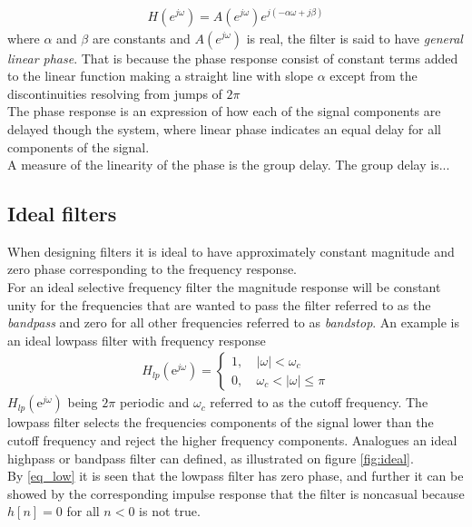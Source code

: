 \begin{align}
H(e^{j\omega})=A(e^{j\omega})e^{j(-\alpha\omega + j\beta)} 
\end{align}
where $\alpha$ and $\beta$ are constants and $A(e^{j\omega})$ is real, the filter is said to have \textit{general linear phase}. That is because the phase response consist of constant terms added to the linear function making a straight line with slope $\alpha$ except from the discontinuities resolving from jumps of $2\pi$ \\
The phase response is an expression of how each of the signal components are delayed though the system, where linear phase indicates an equal delay for all components of the signal.    \\
A measure of the linearity of the phase is the group delay. The group delay is...  

\subsection{Ideal filters} 
When designing filters it is ideal to have approximately constant magnitude and zero phase corresponding to the frequency response. \\ For an ideal selective frequency filter the magnitude response will be constant unity for the frequencies that are wanted to pass the filter referred to as the \textit{bandpass} and zero for all other frequencies referred to as \textit{bandstop}. An example is an ideal lowpass filter with frequency response 
\begin{align}\label{eq:low}
H_{lp}(\text{e}^{j\omega})=
\left\{ \begin{matrix}
1, &\ \left| \omega \right|< \omega_c \\
0, &\ \omega_c < \left| \omega \right| \leq \pi
\end{matrix}\right.
\end{align}     
$H_{lp}(\text{e}^{j\omega})$ being $2\pi$ periodic and $\omega_c$ referred to as the cutoff frequency. The lowpass filter selects the frequencies components of the signal lower than the cutoff frequency and reject the higher frequency components. Analogues an ideal highpass or bandpass filter can defined, as illustrated on figure \ref{fig:ideal}.\\ 
By \eqref{eq_low} it is seen that the lowpass filter has zero phase, and further it can be showed by the corresponding impulse response that the filter is noncasual because $h[n]= 0$ for all $n < 0$ is not true.       

